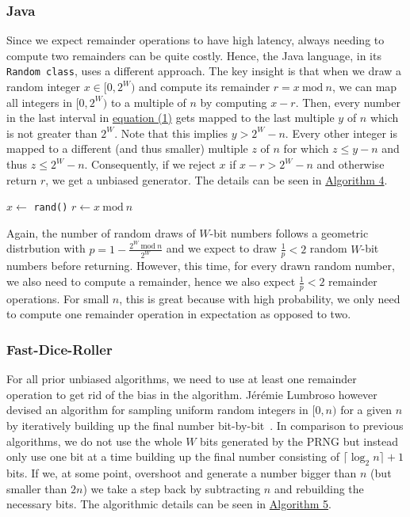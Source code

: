 \documentclass[a4paper, UKenglish, cleveref, autoref, thm-restate]{lipics-v2021}
\newcommand{\Mod}[1]{\ \mathrm{mod}\ #1}
\begin{document}
\subsubsection{Java}\label{sec:2.2.2}
Since we expect remainder operations to have high latency, always needing to compute two remainders can be quite costly.
Hence, the Java language, in its \texttt{Random class}, uses a different approach.
The key insight is that when we draw a random integer $x \in [0,2^W)$ and compute its remainder $r = x \Mod n$, we can map all integers in $[0,2^W)$ to a multiple of $n$ by computing $x - r$.
Then, every number in the last interval in \hyperref[eq:1]{equation (1)} gets mapped to the last multiple $y$ of $n$ which is not greater than $2^W$.
Note that this implies $y > 2^W - n$.
Every other integer is mapped to a different (and thus smaller) multiple $z$ of $n$ for which $z \leq y - n$ and thus $z \leq 2^W - n$.
Consequently, if we reject $x$ if $x - r > 2^W - n$ and otherwise return $r$, we get a unbiased generator.
The details can be seen in \hyperref[alg:java]{Algorithm 4}.

\begin{algorithm}[!htb] \label{alg:java}
    \caption{The Java algorithm.}
    \Require{source of uniformly-distributed random integers in $[0,2^W)$ given by \texttt{rand()}}
    $x \leftarrow$ \texttt{rand()}\;
    $r \leftarrow x \Mod n$\;
    \While{$x - r > 2^W - n$}{
        $x \leftarrow$ \texttt{rand()}\;
        $r \leftarrow x \Mod n$\;
    }
    \;
\end{algorithm}

Again, the number of random draws of $W$-bit numbers follows a geometric distrbution with $p = 1 - \frac{2^W \Mod n}{2^W}$ and we expect to draw $\frac{1}{p} < 2$ random $W$-bit numbers before returning.
However, this time, for every drawn random number, we also need to compute a remainder, hence we also expect $\frac{1}{p} < 2$ remainder operations.
For small $n$, this is great because with high probability, we only need to compute one remainder operation in expectation as opposed to two.

\subsubsection{Fast-Dice-Roller}\label{sec:2.2.3}
For all prior unbiased algorithms, we need to use at least one remainder operation to get rid of the bias in the algorithm.
Jérémie Lumbroso however devised an algorithm for sampling uniform random integers in $[0,n)$ for a given $n$ by iteratively building up the final number bit-by-bit~\cite{Flips}.
In comparison to previous algorithms, we do not use the whole $W$ bits generated by the PRNG but instead only use one bit at a time building up the final number consisting of $\lceil\log_2n\rceil + 1$ bits.
If we, at some point, overshoot and generate a number bigger than $n$ (but smaller than $2n$) we take a step back by subtracting $n$ and rebuilding the necessary bits.
The algorithmic details can be seen in \hyperref[alg:flips]{Algorithm 5}.
\end{document}
